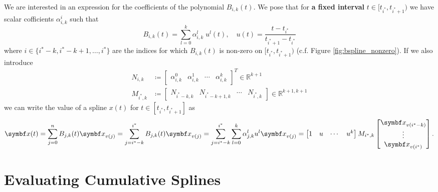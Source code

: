 We are interested in an expression for the coefficients of the polynomial $B_{i, k}(t)$. We pose that for \textbf{a fixed interval} $t \in [t_{i^*}, t_{i^*+1})$ we have scalar cofficients $\alpha^i_{i,k}$ such that
\begin{equation}
  \label{eq:basis_expression}
  B_{i, k}(t) = \sum_{l=0}^k \alpha^{l}_{i, k} \; u^l(t), \quad u(t) = \frac{t - t_{i^*}}{t_{i^*+1} - t_{i^*}}
\end{equation}
where $i \in \{ i^* - k, i^* - k + 1, \ldots, i^* \}$ are the indices for which $B_{i, k}(t)$ is non-zero on $[t_{i^*}, t_{i^*+1})$ (c.f. Figure \ref{fig:bspline_nonzero}). If we also introduce
\begin{equation}
  \label{eq:coeff_matrix_forms}
  \begin{aligned}
    N_{i, k}   & \coloneq \begin{bmatrix} \alpha_{i,k}^0 & \alpha_{i, k}^1 & \cdots & \alpha_{i, k}^k \end{bmatrix}^T \in \mathbb{R}^{k+1}    \\
    M_{i^*, k} & \coloneq \begin{bmatrix}
      N_{i^*-k, k} & N_{i^*-k+1, k} & \cdots & N_{i^*, k}
    \end{bmatrix} \in \mathbb{R}^{k+1, k+1}
  \end{aligned}
\end{equation}
we can write the value of a spline $x(t)$ for $t \in [t_{i^*}, t_{i^*+1}]$ as
\begin{equation}
  \begin{aligned}
    \x(t) = \sum_{j = 0}^n B_{j,k}(t) \x_{v(j)} = \sum_{j = i^*-k}^{i^*} B_{j,k}(t) \x_{v(j)} = \sum_{j = i^*-k}^{i^*} \sum_{l=0}^k \alpha_{j, k}^l u^l \x_{v(j)} =  \begin{bmatrix} 1 & u & \cdots & u^k \end{bmatrix} M_{i^*, k} \begin{bmatrix} \x_{v(i^* - k)} \\ \vdots \\ \x_{v(i^*)} \end{bmatrix}.
  \end{aligned}
\end{equation}


\section{Evaluating Cumulative Splines}

